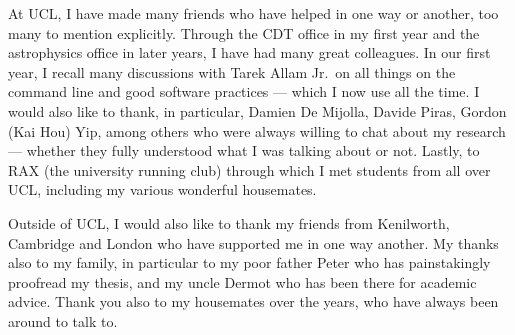 \begin{acknowledgements}
    At UCL, I have made many friends who have helped in one way or another, too many to mention explicitly.
    Through the CDT office in my first year and the astrophysics office in later years, I have had many great colleagues.
    In our first year, I recall many discussions with Tarek Allam Jr.\ on all things on the command line and good software practices --- which I now use all the time.
    I would also like to thank, in particular, Damien De Mijolla, Davide Piras, Gordon (Kai Hou) Yip, among others who were always willing to chat about my research --- whether they fully understood what I was talking about or not.
    Lastly, to RAX (the university running club) through which I met students from all over UCL, including my various wonderful housemates.

    Outside of UCL, I would also like to thank my friends from Kenilworth, Cambridge and London who have supported me in one way another.
    My thanks also to my family, in particular to my poor father Peter who has painstakingly proofread my thesis, and my uncle Dermot who has been there for academic advice.
    Thank you also to my housemates over the years, who have always been around to talk to.
\end{acknowledgements}

\setcounter{tocdepth}{2}

\tableofcontents
\listoffigures
\listoftables
